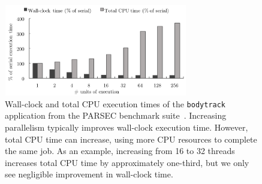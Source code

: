 \begin{figure}[t!]
    \centering
    \includegraphics[width=8cm,height=4cm]{fig/speed-up.pdf}
    \caption{Wall-clock and total CPU execution times of the \texttt{bodytrack} application from the PARSEC benchmark suite~\cite{bienia2008parsec}. Increasing parallelism typically improves wall-clock execution time. However, total CPU time can increase, using more CPU resources to complete the same job. As an example, increasing from 16 to 32 threads increases total CPU time by approximately one-third, but we only see negligible improvement in wall-clock time.}
    \label{fig:speed-up}
\end{figure}
